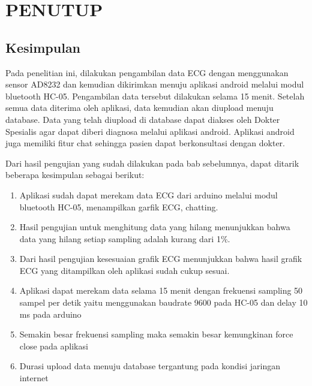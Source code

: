 \chapter{PENUTUP}
\vspace{1ex}

\section{Kesimpulan}
\vspace{1ex}
Pada penelitian ini, dilakukan pengambilan data ECG dengan menggunakan sensor AD8232 dan kemudian dikirimkan menuju aplikasi android melalui modul bluetooth HC-05. Pengambilan data tersebut dilakukan selama 15 menit. Setelah semua data diterima oleh aplikasi, data kemudian akan diupload menuju database. Data yang telah diupload di database dapat diakses oleh Dokter Spesialis agar dapat diberi diagnosa melalui aplikasi android. Aplikasi android juga memiliki fitur chat sehingga pasien dapat berkonsultasi dengan dokter.

Dari hasil pengujian yang sudah dilakukan pada bab sebelumnya, dapat ditarik beberapa kesimpulan sebagai berikut:
\begin{enumerate}[nolistsep]
	
	\item Aplikasi sudah dapat merekam data ECG dari arduino melalui modul bluetooth HC-05, menampilkan garfik ECG, chatting.
	
	\item Hasil pengujian untuk menghitung data yang hilang menunjukkan bahwa data yang hilang setiap sampling adalah kurang dari 1\%.
	
	\item Dari hasil pengujian kesesuaian grafik ECG menunjukkan bahwa hasil grafik ECG yang ditampilkan oleh aplikasi sudah cukup sesuai.
	
	\item Aplikasi dapat merekam data selama 15 menit dengan frekuensi sampling 50 sampel per detik yaitu menggunakan baudrate 9600 pada HC-05 dan delay 10 ms pada arduino
	
	\item Semakin besar frekuensi sampling maka semakin besar kemungkinan force close pada aplikasi
	
	\item Durasi upload data menuju database tergantung pada kondisi jaringan internet
	

	

\end{enumerate}
\vspace{1ex}

